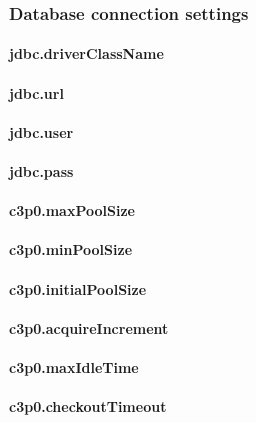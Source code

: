 \documentclass[12pt,a4paper]{report}
\begin{document}
\subsubsection{Database connection settings}

\paragraph{jdbc.driverClassName} 

\paragraph{jdbc.url} 

\paragraph{jdbc.user}

\paragraph{jdbc.pass}


\paragraph{c3p0.maxPoolSize}

\paragraph{c3p0.minPoolSize}

\paragraph{c3p0.initialPoolSize}

\paragraph{c3p0.acquireIncrement}

\paragraph{c3p0.maxIdleTime}

\paragraph{c3p0.checkoutTimeout}
\end{document}

